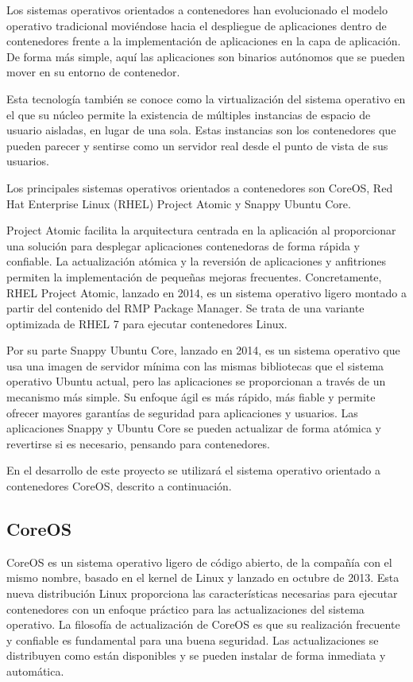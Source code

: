 Los sistemas operativos orientados a contenedores han evolucionado el modelo operativo tradicional moviéndose hacia el despliegue de aplicaciones dentro de contenedores frente a la implementación de aplicaciones en la capa de aplicación. De forma más simple, aquí las aplicaciones son binarios autónomos que se pueden mover en su entorno de contenedor.

Esta tecnología también se conoce como la virtualización del sistema operativo en el que su núcleo permite la existencia de múltiples instancias de espacio de usuario aisladas, en lugar de una sola. Estas instancias son los contenedores que pueden parecer y sentirse como un servidor real desde el punto de vista de sus usuarios.

Los principales sistemas operativos orientados a contenedores son CoreOS, Red Hat Enterprise Linux (RHEL) Project Atomic y Snappy Ubuntu Core.

Project Atomic facilita la arquitectura centrada en la aplicación al proporcionar una solución para desplegar aplicaciones contenedoras de forma rápida y confiable. La actualización atómica y la reversión de aplicaciones y anfitriones permiten la implementación de pequeñas mejoras frecuentes. Concretamente, RHEL Project Atomic, lanzado en 2014, es un sistema operativo ligero montado a partir del contenido del RMP Package Manager. Se trata de una variante optimizada de RHEL 7 para ejecutar contenedores Linux.

Por su parte Snappy Ubuntu Core, lanzado en 2014, es un sistema operativo que usa una imagen de servidor mínima con las mismas bibliotecas que el sistema operativo Ubuntu actual, pero las aplicaciones se proporcionan a través de un mecanismo más simple. Su enfoque ágil es más rápido, más fiable y permite ofrecer mayores garantías de seguridad para aplicaciones y usuarios. Las aplicaciones Snappy y Ubuntu Core se pueden actualizar de forma atómica y revertirse si es necesario, pensando para contenedores.

En el desarrollo de este proyecto se utilizará el sistema operativo orientado a contenedores CoreOS, descrito a continuación.

\subsection{CoreOS}

CoreOS es un sistema operativo ligero de código abierto, de la compañía con el mismo nombre, basado en el kernel de Linux y lanzado en octubre de 2013. Esta nueva distribución Linux proporciona las características necesarias para ejecutar contenedores con un enfoque práctico para las actualizaciones del sistema operativo. La filosofía de actualización de CoreOS es que su realización frecuente y confiable es fundamental para una buena seguridad. Las actualizaciones se distribuyen como están disponibles y se pueden instalar de forma inmediata y automática.  

